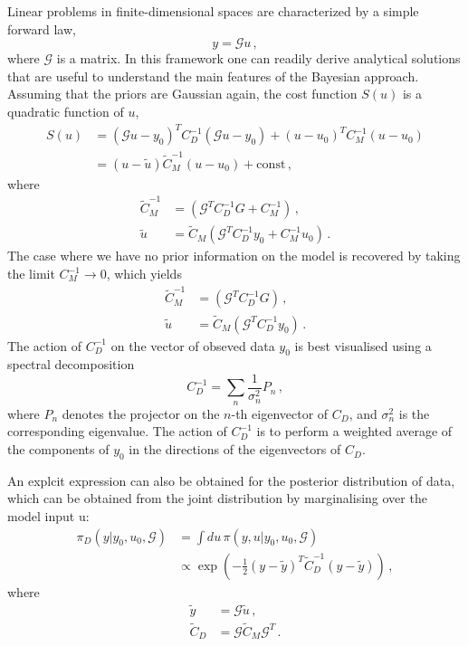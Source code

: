 Linear problems in finite-dimensional spaces are characterized by a simple forward law, 
\begin{equation}
  \label{eq:MatrixG}
  y = \mathcal{G} u\, ,
\end{equation}
where $\mathcal{G}$ is a matrix. In this framework one can readily  derive
analytical solutions that are useful to understand the main features of the
Bayesian approach. Assuming that the priors are Gaussian again, the cost
function $S(u)$ is a quadratic function of $u$,
\begin{align}
  \label{eq:CostLinGauss}
  S(u) &= 
  \left(\mathcal{G} u - y_0 \right)^T C_D^{-1} 
  \left(\mathcal{G} u - y_0 \right) + 
  \left( u - u_0 \right)^T C_M^{-1} \left(u - u_0 \right) \\
  &= 
  \left(u - \tilde{u}\right) \tilde{C}_M^{-1}
  \left(u - u_0\right) + \mathrm{const}\, ,
\end{align} 
where
\begin{align}
  \label{eq:PostParams}
  \tilde{C}_M^{-1} &= 
  \left(
    \mathcal{G}^T C_D^{-1} G + C_M^{-1}
  \right)\, , \\
  \tilde{u} &=
  \tilde{C}_M  \left(
    \mathcal{G}^T C_D^{-1} y_0 + C_M^{-1} u_0
  \right)\, .
\end{align}
The case where we have no prior information on the model is recovered by taking
the limit $C_M^{-1} \to 0$, which yields
\begin{align}
  \label{eq:NoPriorLinModel}
  \tilde{C}_M^{-1} &= 
  \left(
    \mathcal{G}^T C_D^{-1} G
  \right)\, , \\
  \tilde{u} &=
  \tilde{C}_M  \left(
    \mathcal{G}^T C_D^{-1} y_0 
  \right)\, .
\end{align}
The action of $C_D^{-1}$ on the vector of obseved data $y_0$ is best visualised using a spectral decomposition
\begin{equation}
  \label{eq:CDSpecDec}
  C_D^{-1} = \sum_n \frac{1}{\sigma_n^2} P_n\, ,
\end{equation}
where $P_n$ denotes the projector on the $n$-th eigenvector of $C_D$, and
$\sigma_n^2$ is the corresponding eigenvalue. The action of $C_D^{-1}$ is to
perform a weighted average of the components of $y_0$ in the directions of the
eigenvectors of $C_D$.

An explcit expression can also be obtained for the posterior distribution of
data, which can be obtained from the joint distribution by marginalising over
the model input u:
\begin{align}
  \pi_D(y|y_0,u_0,\mathcal{G})
  &= \int du\, \pi(y,u|y_0,u_0,\mathcal{G}) \\
  &\propto \exp\left(
    -\frac12 \left(y - \tilde{y}\right)^T \tilde{C}_D^{-1}
    \left(y - \tilde{y}\right)
  \right)\, ,
\end{align}
where
\begin{align}
  \tilde{y} &= \mathcal{G} \tilde{u}\, , \\
  \tilde{C}_D &= \mathcal{G} \tilde{C}_M \mathcal{G}^T\, .
\end{align}

